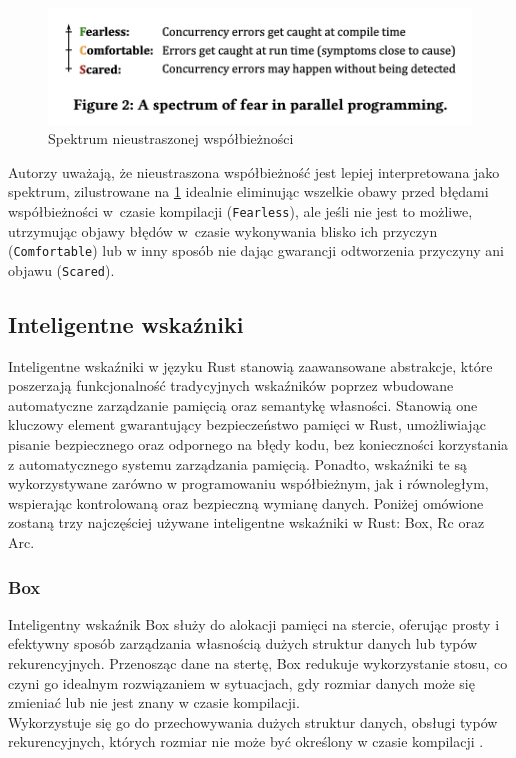 \begin{figure}[H]
    \centering
    \includegraphics[width=0.6\linewidth]{images/FearlesRustExplain.png}
    \caption{Spektrum nieustraszonej współbieżności \cite{WhenIsParallelismFearlessandZeroCostwithRust?}}
    \label{fig:FearlessSpectrum}
\end{figure}
Autorzy \cite{WhenIsParallelismFearlessandZeroCostwithRust?}
uważają, że nieustraszona współbieżność jest lepiej interpretowana jako spektrum, zilustrowane na \ref{fig:FearlessSpectrum} idealnie eliminując wszelkie obawy przed błędami współbieżności w~czasie kompilacji (\texttt{Fearless}), ale jeśli nie jest to możliwe, utrzymując objawy błędów w~czasie wykonywania blisko ich przyczyn (\texttt{Comfortable}) lub w inny sposób nie dając gwarancji odtworzenia przyczyny ani objawu (\texttt{Scared}).

\subsection{Inteligentne wskaźniki }
Inteligentne wskaźniki w języku Rust stanowią zaawansowane abstrakcje, które poszerzają funkcjonalność tradycyjnych wskaźników poprzez wbudowane automatyczne zarządzanie pamięcią oraz semantykę własności. Stanowią one kluczowy element gwarantujący bezpieczeństwo pamięci w Rust, umożliwiając pisanie bezpiecznego oraz odpornego na błędy kodu, bez konieczności korzystania z automatycznego systemu zarządzania pamięcią. Ponadto, wskaźniki te są wykorzystywane zarówno w programowaniu współbieżnym, jak i równoległym, wspierając kontrolowaną oraz bezpieczną wymianę danych. Poniżej omówione zostaną trzy najczęściej używane inteligentne wskaźniki w Rust: Box, Rc oraz Arc.

\subsubsection{Box}
\label{BOX}
Inteligentny wskaźnik Box służy do alokacji pamięci na stercie, oferując prosty i efektywny sposób zarządzania własnością dużych struktur danych lub typów rekurencyjnych. Przenosząc dane na stertę, Box redukuje wykorzystanie stosu, co czyni go idealnym rozwiązaniem w sytuacjach, gdy rozmiar danych może się zmieniać lub nie jest znany w czasie kompilacji.\\
Wykorzystuje się go do przechowywania dużych struktur danych, obsługi typów rekurencyjnych, których rozmiar nie może być określony w czasie kompilacji \cite{TheRustProgrammingLanguage}.

